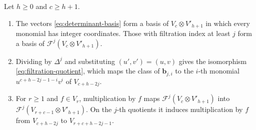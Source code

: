 \begin{lemma}\label{lem:determinant-basis}
Let \(h\ge0\) and \(c\ge h+1\).
\begin{enumerate}
\item[(a)] The vectors \eqref{eq:determinant-basis} form a basis of
\(V_c\otimes V'_{h+1}\) in which every monomial has integer coordinates.
Those with filtration index at least \(j\) form a basis of
\(\mathcal F^j(V_c\otimes V'_{h+1})\).
\item[(b)] Dividing by \(\Delta^j\) and substituting \((u',v')=(u,v)\)
gives the isomorphism \eqref{eq:filtration-quotient}, which maps the
class of \(\mathbf b_{j,i}\) to the \(i\)-th monomial
\(u^{c+h-2j-1-i}v^i\) of \(V_{c+h-2j}\).
\item[(c)] For \(r\ge1\) and \(f\in V_r\), multiplication by \(f\) maps
\(\mathcal F^j(V_c\otimes V'_{h+1})\) into
\(\mathcal F^j(V_{r+c-1}\otimes V'_{h+1})\). On the \(j\)-th quotients
it induces multiplication by \(f\) from \(V_{c+h-2j}\) to
\(V_{r+c+h-2j-1}\).
\end{enumerate}
\end{lemma}

